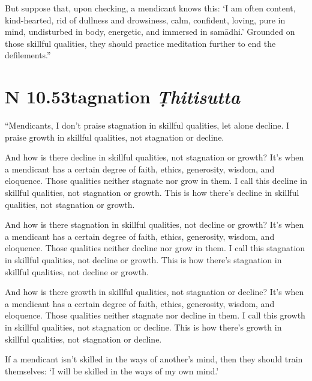 \documentclass[12pt,openany]{book}%
\newcommand*{\suttatitleacronym}[1]{\smaller[2]{#1}\vspace*{.3em}}
\newcommand*{\suttatitletranslation}[1]{\linebreak{#1}}
\newcommand*{\suttatitleroot}[1]{\linebreak\smaller[2]\itshape{#1}}
\newcommand*{\tocacronym}[1]{\hspace*{-3.3em}{#1}\quad}
\newcommand*{\toctranslation}[1]{#1}
\newcommand*{\tocroot}[1]{(\textit{#1})}
\begin{document}
But suppose that, upon checking, a mendicant knows this: ‘I am often content, kind-hearted, rid of dullness and drowsiness, calm, confident, loving, pure in mind, undisturbed in body, energetic, and immersed in \textsanskrit{samādhi}.’ Grounded on those skillful qualities, they should practice meditation further to end the defilements.” 

%
\section*{{\suttatitleacronym AN 10.53}{\suttatitletranslation Stagnation }{\suttatitleroot Ṭhitisutta}}
\addcontentsline{toc}{section}{\tocacronym{AN 10.53} \toctranslation{Stagnation } \tocroot{Ṭhitisutta}}

“Mendicants, I don’t praise stagnation in skillful qualities, let alone decline. I praise growth in skillful qualities, not stagnation or decline. 

And how is there decline in skillful qualities, not stagnation or growth? It’s when a mendicant has a certain degree of faith, ethics, generosity, wisdom, and eloquence. Those qualities neither stagnate nor grow in them. I call this decline in skillful qualities, not stagnation or growth. This is how there’s decline in skillful qualities, not stagnation or growth. 

And how is there stagnation in skillful qualities, not decline or growth? It’s when a mendicant has a certain degree of faith, ethics, generosity, wisdom, and eloquence. Those qualities neither decline nor grow in them. I call this stagnation in skillful qualities, not decline or growth. This is how there’s stagnation in skillful qualities, not decline or growth. 

And how is there growth in skillful qualities, not stagnation or decline? It’s when a mendicant has a certain degree of faith, ethics, generosity, wisdom, and eloquence. Those qualities neither stagnate nor decline in them. I call this growth in skillful qualities, not stagnation or decline. This is how there’s growth in skillful qualities, not stagnation or decline. 

If a mendicant isn’t skilled in the ways of another’s mind, then they should train themselves: ‘I will be skilled in the ways of my own mind.’ 
\end{document}
